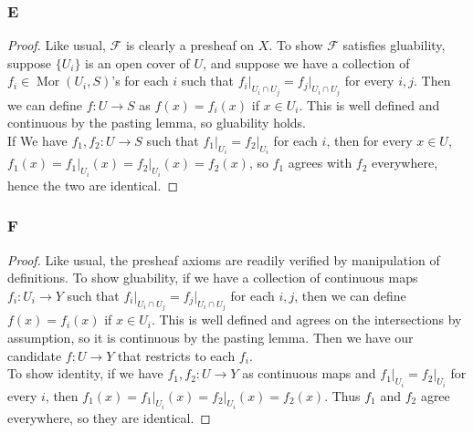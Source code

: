 \documentclass{article}
\newcommand{\fF}{\mathscr{F}}
\DeclareMathOperator{\Mor}{\mathrm{Mor}}
\begin{document}
\subsubsection{E}\label{2.2.E}
\begin{proof}
    Like usual, $\fF$ is clearly a presheaf on $X$. To show $\fF$ satisfies gluability, suppose $\{U_i\}$ is an open cover of $U$, and suppose we have a collection of $f_i\in \Mor(U_i,S)$'s for each $i$ such that $f_i\vert_{U_i\cap U_j}=f_j\vert_{U_i\cap U_j}$ for every $i,j$. Then we can define $f:U\to S$ as $f(x)=f_i(x)$ if $x\in U_i$. This is well defined and continuous by the pasting lemma, so gluability holds.\\
    If We have $f_1,f_2:U\to S$ such that $f_1\vert_{U_i}=f_2\vert_{U_i}$ for each $i$, then for every $x\in U$, $f_1(x)=f_1\vert_{U_i}(x)=f_2\vert_{U_i}(x)=f_2(x)$, so $f_1$ agrees with $f_2$ everywhere, hence the two are identical.
\end{proof}
\subsubsection{F}\label{2.2.F}
\begin{proof}
    Like usual, the presheaf axioms are readily verified by manipulation of definitions. To show gluability, if we have a collection of continuous maps $f_i:U_i\to Y$ such that $f_i\vert_{U_i\cap U_j}=f_j\vert_{U_i\cap U_j}$ for each $i,j$, then we can define $f(x)=f_i(x)$ if $x\in U_i$. This is well defined and agrees on the intersections by assumption, so it is continuous by the pasting lemma. Then we have our candidate $f:U\to Y$ that restricts to each $f_i$.\\
    To show identity, if we have $f_1,f_2:U\to Y$ as continuous maps and $f_1\vert_{U_i}=f_2\vert_{U_i}$ for every $i$, then $f_1(x)=f_1\vert_{U_i}(x)=f_2\vert_{U_i}(x)=f_2(x)$. Thus $f_1$ and $f_2$ agree everywhere, so they are identical.
\end{proof}
\end{document}
